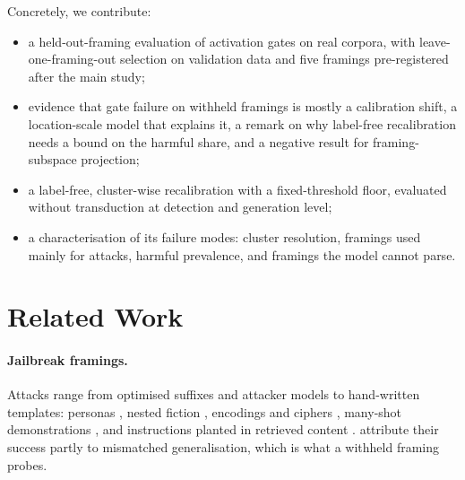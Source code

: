 \documentclass[11pt]{article}
\begin{document}
Concretely, we contribute:
\begin{itemize}
\item a held-out-framing evaluation of activation gates on real corpora, with leave-one-framing-out selection on validation data and five framings pre-registered after the main study;
\item evidence that gate failure on withheld framings is mostly a calibration shift, a location-scale model that explains it, a remark on why label-free recalibration needs a bound on the harmful share, and a negative result for framing-subspace projection;
\item a label-free, cluster-wise recalibration with a fixed-threshold floor, evaluated without transduction at detection and generation level;
\item a characterisation of its failure modes: cluster resolution, framings used mainly for attacks, harmful prevalence, and framings the model cannot parse.
\end{itemize}

\section{Related Work}

\paragraph{Jailbreak framings.}
Attacks range from optimised suffixes \citep{zou2023gcg,liu2024autodan} and attacker models \citep{chao2025pair,mehrotra2024tap} to hand-written templates: personas \citep{shen2024dan}, nested fiction \citep{li2023deepinception}, encodings and ciphers \citep{wei2023jailbroken,yuan2024cipherchat}, many-shot demonstrations \citep{anil2024manyshot}, and instructions planted in retrieved content \citep{greshake2023indirect}. \citet{wei2023jailbroken} attribute their success partly to mismatched generalisation, which is what a withheld framing probes.
\end{document}
